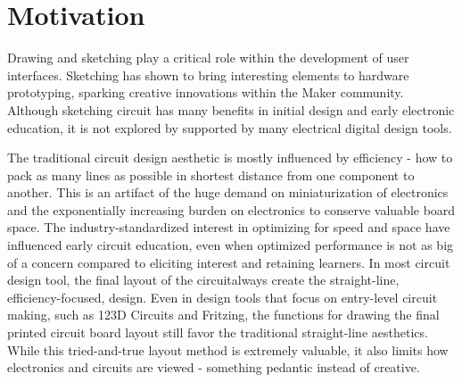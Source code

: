 \documentclass{sigchi}
\begin{document}
\section{Motivation}

Drawing and sketching play a critical role within the development of user interfaces. Sketching has shown to bring interesting elements to hardware prototyping, sparking creative innovations within the Maker community.
Although sketching circuit has many benefits in initial design and early electronic education, it is not explored by supported by many electrical digital design tools.


The traditional circuit design aesthetic is mostly influenced by efficiency - how to pack as many lines as possible in shortest distance from one component to another.
This is an artifact of the huge demand on miniaturization of electronics and the exponentially increasing burden on electronics to conserve valuable board space.
The industry-standardized interest in optimizing for speed and space have influenced early circuit education, even when optimized performance is not as big of a concern compared to eliciting interest and retaining learners.
In most circuit design tool, the final layout of the circuitalways create the straight-line, efficiency-focused, design.
Even in design tools that focus on entry-level circuit making, such as 123D Circuits and Fritzing, the functions for drawing the final printed circuit board layout still favor the traditional straight-line aesthetics.
While this tried-and-true layout method is extremely valuable, it also limits how electronics and circuits are viewed - something pedantic instead of creative.
\end{document}
